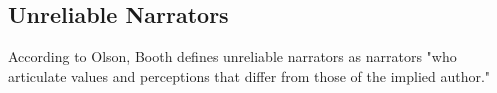 \subsection{Unreliable Narrators}
According to Olson, Booth defines unreliable narrators as narrators "who articulate values and perceptions that differ from those of the implied author."\cite[p. 94]{Olson}